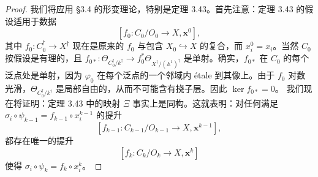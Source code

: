 \begin{proof}
 我们将应用 §3.4 的形变理论，特别是定理 3.43。首先注意：定理 3.43 的假设适用于数据
\[
[f_0:C_0/O_0\to X,\mathbf{x}^0],
\]
其中 $f_0:C^\dagger_0\to X^\dagger$ 现在是原来的 $f_0$ 与包含 $X_0\hookrightarrow X$ 的复合，而 $x^0_i=x_i$。当然 $C_0$ 按假设是有理的，且 $f_{0*}:\Theta_{C^\dagger_0/k^\dagger}\to f^*_0\Theta_{X^\dagger/(\mathbb{A}^1)^\dagger}$ 是单射。确实，$f_{0*}$ 在 $C_0$ 的每个泛点处是单射，因为 $\varphi_0$ 在每个泛点的一个邻域内 étale 到其像上。由于 $f_0$ 对数光滑，$\Theta_{C^\dagger_0/k^\dagger}$ 是局部自由的，从而不可能含有挠子层。因此 $\ker f_{0*}=0$。
我们现在将证明：定理 3.43 中的映射 $\Xi$ 事实上是同构。这就表明：对任何满足 $\sigma_i\circ\psi_{k-1}=f_{k-1}\circ x^{k-1}_i$ 的提升
\[
[f_{k-1}:C_{k-1}/O_{k-1}\to X,\mathbf{x}^{k-1}],
\]
都存在唯一的提升
\[
[f_k:C_k/O_k\to X,\mathbf{x}^k]
\]
使得 $\sigma_i\circ\psi_k=f_k\circ x^k_i$。


\end{proof}
